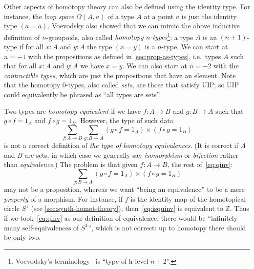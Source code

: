 \documentclass[10pt]{article}
\def\oo{\ensuremath{\infty}}
\def\io{\ensuremath{(\oo,1)}}
\def\tprod{\textstyle\prod}
\numberwithin{equation}{section}
\begin{document}
Other aspects of homotopy theory can also be defined using the identity type.
For instance, the \emph{loop space} $\Omega(A,a)$ of a type $A$ at a point $a$ is just the identity type $(a=a)$.
Voevodsky also showed that we can mimic the above inductive definition of $n$-groupoids, also called \emph{homotopy $n$-types}\footnote{Voevodsky's terminology~\cite{vv:unimath} is ``type of h-level $n+2$''.}: a type $A$ is an $(n+1)$-type if for all $x:A$ and $y:A$ the type $(x=y)$ is a $n$-type.
We can start at $n=-1$ with the propositions as defined in \cref{sec:prop-as-types}, i.e.\ types $A$ such that for all $x:A$ and $y:A$ we have $x=y$.
We can also start at $n=-2$ with the \emph{contractible types}, which are just the propositions that have an element.
Note that the homotopy $0$-types, also called \emph{sets}, are those that satisfy UIP; so UIP
could equivalently be phrased as ``all types are sets''.

Two types are \emph{homotopy equivalent} if we have $f:A\to B$ and $g:B\to A$ such that $g\circ f = 1_A$ and $f\circ g = 1_B$.
However, the type of such data
\begin{equation}
  \textstyle\sum_{f:A\to B} \sum_{g:B\to A} (g\circ f = 1_A)\times (f\circ g = 1_B)\label{eq:qinv}
\end{equation}
is not a correct definition of \emph{the type of homotopy equivalences}. %
(It is correct if $A$ and $B$ are sets, in which case we generally say \emph{isomorphism} or \emph{bijection} rather than \emph{equivalence}.)
The problem is that given $f:A\to B$, the rest of~\eqref{eq:qinv}:
\begin{equation}
  \textstyle\sum_{g:B\to A} (g\circ f = 1_A)\times (f\circ g = 1_B)\label{eq:isquinv}
\end{equation}
may not be a proposition, whereas we want ``being an equivalence'' to be a mere \emph{property} of a morphism. %
For instance, if $f$ is the identity map of the homotopical circle $S^1$ (see \cref{sec:synth-homot-theory}), then~\eqref{eq:isquinv} is equivalent to $\mathbb{Z}$.
Thus if we took~\eqref{eq:qinv} as our definition of equivalence, there would be ``infinitely many self-equivalences of $S^1$'', which is not correct: up to homotopy there should be only two.
\end{document}
